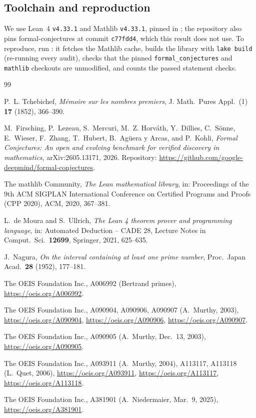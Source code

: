 \documentclass[11pt]{amsart}
\theoremstyle{plain}
\theoremstyle{definition}
\begin{document}
\subsection*{Toolchain and reproduction}
We use Lean~4 \cite{Lean4} \texttt{v4.33.1} and Mathlib \cite{Mathlib} \texttt{v4.33.1}, pinned in ; the repository also pins formal-conjectures \cite{FC} at commit \texttt{c77fdd4}, which this result does not use. To reproduce, run : it fetches the Mathlib cache, builds the library with \texttt{lake build} (re-running every audit), checks that the pinned \texttt{formal\_conjectures} and \texttt{mathlib} checkouts are unmodified, and counts the passed statement checks.

{\footnotesize\raggedright
\begin{thebibliography}{99}

P.~L. Tchebichef, \emph{M\'emoire sur les nombres premiers}, J. Math.\ Pures Appl.\ (1) \textbf{17} (1852), 366--390.

M.~Firsching, P.~Lezeau, S.~Mercuri, M.~Z. Horv\'ath, Y.~Dillies, C.~S\"onne, E.~Wieser, F.~Zhang, T.~Hubert, B.~Ag\"uera y Arcas, and P.~Kohli, \emph{Formal Conjectures: An open and evolving benchmark for verified discovery in mathematics}, arXiv:2605.13171, 2026. Repository: \url{https://github.com/google-deepmind/formal-conjectures}.

The mathlib Community, \emph{The Lean mathematical library}, in: Proceedings of the 9th ACM SIGPLAN International Conference on Certified Programs and Proofs (CPP 2020), ACM, 2020, 367--381.

L.~de Moura and S.~Ullrich, \emph{The Lean 4 theorem prover and programming language}, in: Automated Deduction -- CADE 28, Lecture Notes in Comput.\ Sci.\ \textbf{12699}, Springer, 2021, 625--635.

J.~Nagura, \emph{On the interval containing at least one prime number}, Proc.\ Japan Acad.\ \textbf{28} (1952), 177--181.

The OEIS Foundation Inc., A006992 (Bertrand primes), \url{https://oeis.org/A006992}.

The OEIS Foundation Inc., A090904, A090906, A090907 (A.~Murthy, 2003), \url{https://oeis.org/A090904}, \url{https://oeis.org/A090906}, \url{https://oeis.org/A090907}.

The OEIS Foundation Inc., A090905 (A.~Murthy, Dec.~13, 2003), \url{https://oeis.org/A090905}.

The OEIS Foundation Inc., A093911 (A.~Murthy, 2004), A113117, A113118 (L.~Quet, 2006), \url{https://oeis.org/A093911}, \url{https://oeis.org/A113117}, \url{https://oeis.org/A113118}.

The OEIS Foundation Inc., A381901 (A.~Niedermaier, Mar.~9, 2025), \url{https://oeis.org/A381901}.

\end{thebibliography}
}
\end{document}
